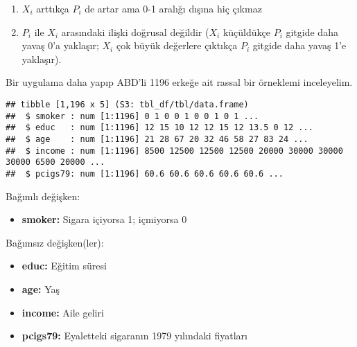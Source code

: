\documentclass[
]{book}
\newenvironment{Shaded}{\begin{snugshade}}{\end{snugshade}}
\newcommand{\DecValTok}[1]{\textcolor[rgb]{0.00,0.00,0.81}{#1}}
\newcommand{\KeywordTok}[1]{\textcolor[rgb]{0.13,0.29,0.53}{\textbf{#1}}}
\newcommand{\NormalTok}[1]{#1}
\newcommand{\OperatorTok}[1]{\textcolor[rgb]{0.81,0.36,0.00}{\textbf{#1}}}
\newcommand{\StringTok}[1]{\textcolor[rgb]{0.31,0.60,0.02}{#1}}
\providecommand{\tightlist}{%
  \setlength{\itemsep}{0pt}\setlength{\parskip}{0pt}}
\begin{document}
\begin{enumerate}
\def\labelenumi{\roman{enumi})}
\item
  \(X_i\) arttıkça \(P_i\) de artar ama 0-1 aralığı dışına hiç çıkmaz
\item
  \(P_i\) ile \(X_i\) arasındaki ilişki doğrusal değildir (\(X_i\) küçüldükçe \(P_i\) gitgide daha yavaş 0'a yaklaşır; \(X_i\) çok büyük değerlere çıktıkça \(P_i\) gitgide daha yavaş 1'e yaklaşır).
\end{enumerate}

Bir uygulama daha yapıp ABD'li 1196 erkeğe ait rassal bir örneklemi inceleyelim.

\begin{Shaded}
\end{Shaded}

\begin{verbatim}
## tibble [1,196 x 5] (S3: tbl_df/tbl/data.frame)
##  $ smoker : num [1:1196] 0 1 0 0 1 0 0 1 0 1 ...
##  $ educ   : num [1:1196] 12 15 10 12 12 15 12 13.5 0 12 ...
##  $ age    : num [1:1196] 21 28 67 20 32 46 58 27 83 24 ...
##  $ income : num [1:1196] 8500 12500 12500 12500 20000 30000 30000 30000 6500 20000 ...
##  $ pcigs79: num [1:1196] 60.6 60.6 60.6 60.6 60.6 ...
\end{verbatim}

Bağımlı değişken:

\begin{itemize}
\tightlist
\item
  \textbf{smoker:} Sigara içiyorsa 1; içmiyorsa 0
\end{itemize}

Bağımsız değişken(ler):

\begin{itemize}
\item
  \textbf{educ:} Eğitim süresi
\item
  \textbf{age:} Yaş
\item
  \textbf{income:} Aile geliri
\item
  \textbf{pcigs79:} Eyaletteki sigaranın 1979 yılındaki fiyatları
\end{itemize}
\end{document}
